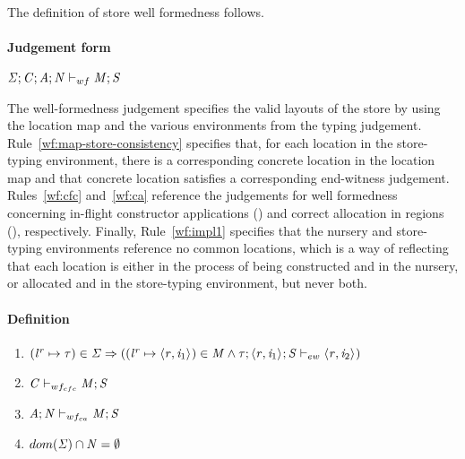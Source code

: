 The definition of store well formedness follows.

\paragraph{Judgement form}

$\mathit{\Sigma};\mathit{C};\mathit{A};\mathit{N} \vdash_{wf} \mathit{M};\mathit{S}$

The well-formedness judgement specifies the valid layouts of the store by using the location
map and the various environments from the typing judgement.
%
Rule~\ref{wf:map-store-consistency} specifies that, for each location in the store-typing environment,
there is a corresponding concrete location in the location map and that concrete location satisfies
a corresponding end-witness judgement.
%
Rules~\ref{wf:cfc} and~\ref{wf:ca} reference the judgements for well formedness concerning
in-flight constructor applications () and correct allocation in
regions (), respectively.
%
Finally, Rule~\ref{wf:impl1} specifies that the nursery and store-typing environments reference
no common locations, which is a way of reflecting that each location is either in the process
of being constructed and in the nursery, or allocated and in the store-typing environment, but
never both.

\paragraph{Definition}

\begin{enumerate}

    \item \label{wf:map-store-consistency} $ ({\mathit{l}}^{\mathit{r}} \mapsto \mathit{\tau}) \in \mathit{\Sigma} \Rightarrow \\
            (({\mathit{l}}^{\mathit{r}} \mapsto \langle \mathit{r}, \mathit{i}_1 \rangle ^{}) \in \mathit{M} \wedge \\
            \mathit{\tau};\langle \mathit{r}, \mathit{i}_1 \rangle ^{};\mathit{S} \vdash_{ew} \langle \mathit{r}, \mathit{i}_2 \rangle ^{})
          $

    \item \label{wf:cfc} $\mathit{C} \vdash_{wf_{cfc}} \mathit{M};\mathit{S}$

    \item \label{wf:ca} $\mathit{A};\mathit{N} \vdash_{wf_{ca}} \mathit{M};\mathit{S}$

    \item \label{wf:impl1} $dom(\mathit{\Sigma}) \cap \mathit{N} = \emptyset $
\end{enumerate}


